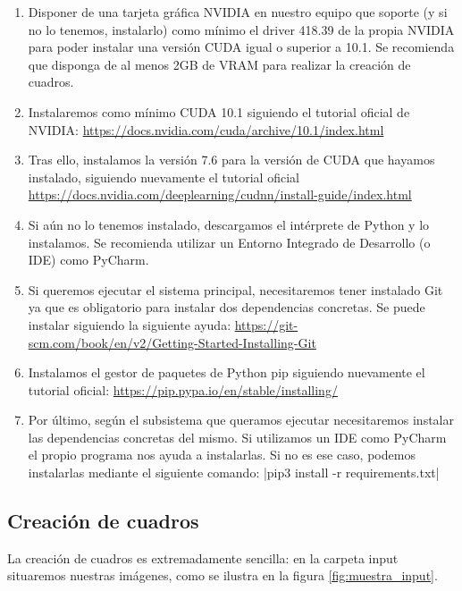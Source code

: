 \documentclass[../main.tex]{subfiles}
\begin{document}
\begin{enumerate}
    \item Disponer de una tarjeta gráfica NVIDIA en nuestro equipo que soporte (y si no lo tenemos, instalarlo)  como mínimo el driver 418.39 de la propia NVIDIA para poder instalar una versión CUDA igual o superior a 10.1. Se recomienda que disponga de al menos 2GB de VRAM para realizar la creación de cuadros.
    \item Instalaremos como mínimo CUDA 10.1 siguiendo el tutorial oficial de NVIDIA: \url{https://docs.nvidia.com/cuda/archive/10.1/index.html}
    \item Tras ello, instalamos la versión 7.6 para la versión de CUDA que hayamos instalado, siguiendo nuevamente el tutorial oficial \url{https://docs.nvidia.com/deeplearning/cudnn/install-guide/index.html}
    \item Si aún no lo tenemos instalado, descargamos el intérprete de Python y lo instalamos. Se recomienda utilizar un Entorno Integrado de Desarrollo (o IDE) como PyCharm.
    \item Si queremos ejecutar el sistema principal, necesitaremos tener instalado Git ya que es obligatorio para instalar dos dependencias concretas. Se puede instalar siguiendo la siguiente ayuda: \url{https://git-scm.com/book/en/v2/Getting-Started-Installing-Git}
    \item Instalamos el gestor de paquetes de Python pip siguiendo nuevamente el tutorial oficial: \url{https://pip.pypa.io/en/stable/installing/}
    \item Por último, según el subsistema que queramos ejecutar necesitaremos instalar las dependencias concretas del mismo. Si utilizamos un IDE como PyCharm el propio programa nos ayuda a instalarlas. Si no es ese caso, podemos instalarlas mediante el siguiente comando: |pip3 install -r requirements.txt| 
\end{enumerate}

\subsection{Creación de cuadros}

La creación de cuadros es extremadamente sencilla: en la carpeta input situaremos nuestras imágenes, como se ilustra en la figura \ref{fig:muestra_input}.
\end{document}
